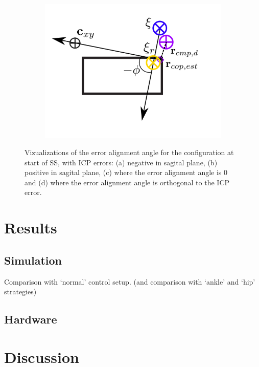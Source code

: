 \begin{figure}[h]
\begin{subfigure}{0.5\textwidth}
    \caption{}
     \label{fig:phiVizc}
  \end{subfigure}
  \begin{subfigure}{0.5\textwidth}
    \centering
  \includegraphics[width=.8\linewidth]{STYLESTUFF/ICPplanStartSSPhiViz90.png}
    \caption{}
     \label{fig:phiVizd}
  \end{subfigure}
  \caption{Vizualizations of the error alignment angle for the configuration at start of \ac{SS}, with \ac{ICP} errors: (a) negative in sagital plane, (b) positive in sagital plane, (c) where the error alignment angle is $0$ and (d) where the error alignment angle is orthogonal to the \ac{ICP} error. }
  \label{fig:phiViz}
\end{figure}


\section{Results}
\subsection{Simulation}
Comparison with `normal' control setup. (and comparison with `ankle' and `hip' strategies)
\subsection{Hardware}

\section{Discussion}
